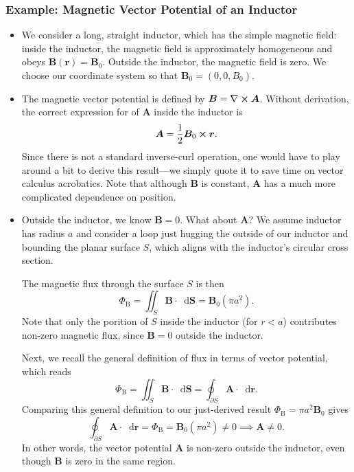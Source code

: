 \documentclass[11pt, a4paper]{article}
\newcommand{\diff}{\mathop{}\!\mathrm{d}} %
\renewcommand{\vec}[1]{\bm{#1}} %
\renewcommand{\r}{\vec{r}}
\newcommand{\B}{\vec{B}} %
\newcommand{\A}{\vec{A}} %
\renewcommand{\curl}{\nabla \cross}
\begin{document}
\subsubsection{Example: Magnetic Vector Potential of an Inductor}
\begin{itemize}
    \item We consider a long, straight inductor, which has the simple magnetic field: inside the inductor, the magnetic field is approximately homogeneous and obeys $ \B(\r) = \B_{0} $. Outside the inductor, the magnetic field is zero. We choose our coordinate system so that $ \B_{0} = (0, 0, B_{0}) $. 
	
	\item The magnetic vector potential is defined by $ \B = \curl \A $. Without derivation, the correct expression for of $ \A $ inside the inductor is 
	\begin{equation*}
		\A = \frac{1}{2}\B_{0} \cross \r.
	\end{equation*}
	Since there is not a standard inverse-curl operation, one would have to play around a bit to derive this result---we simply quote it to save time on vector calculus acrobatics. Note that although $ \B $ is constant, $ \A $ has a much more complicated dependence on position.
	
	\item Outside the inductor, we know $ \B = 0 $. What about $ \A $? We assume inductor has radius $ a $ and consider a loop just hugging the outside of our inductor and bounding the planar surface $ S $, which aligns with the inductor's circular cross section.
	
	The magnetic flux through the surface $ S $ is then
	\begin{equation*}
		\Phi_{\text{B}} = \iint_{S} \B \cdot \diff \vec{S} = \B_{0} (\pi a^{2}).
	\end{equation*}
    Note that only the porition of $ S $ inside the inductor (for $ r < a $) contributes non-zero magnetic flux, since $ \B = 0 $ outside the inductor.
	
	Next, we recall the general definition of flux in terms of vector potential, which reads
	\begin{equation*}
		\Phi_{\text{B}} = \iint_{S} \B \cdot \diff \vec{S} = \oint_{\partial S} \A \cdot \diff \r.
	\end{equation*}
    Comparing this general definition to our just-derived result $ \Phi_{\text{B}} = \pi a^{2}\B_{0} $ gives
	\begin{equation*}
		\oint_{\partial S} \A \cdot \diff \r = \Phi_{\text{B}} = \B_{0} (\pi a^{2}) \neq 0  \implies \A \neq 0.
	\end{equation*}
    In other words, the vector potential $ \A $ is non-zero outside the inductor, even though $ \B $ is zero in the same region.
	

\end{itemize}
\end{document}
